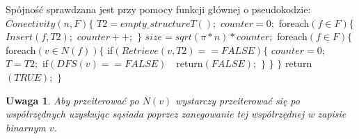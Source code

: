 \documentclass{pracamgr}
\newtheorem{remark}[theorem]{Uwaga}
\begin{document}
     Spójność sprawdzana jest przy pomocy funkcji głównej o pseudokodzie:\newline\newline
     \hspace*{0pt}$Conectivity(n,F)\{$\newline
     \hspace*{16pt}	$T2=empty\_structureT();$\newline
     \hspace*{16pt}	$counter=0;$\newline
     \hspace*{16pt}	foreach$(f\in F)\{$\newline
     \hspace*{32pt}		$Insert(f,T2);$\newline
     \hspace*{32pt}		$counter++;$\newline
     \hspace*{16pt}	$\}$\newline
     \hspace*{16pt}	$size=sqrt(\pi*n)*counter;$\newline
     \hspace*{16pt}	foreach$(f\in F)\{$\newline
     \hspace*{32pt}		foreach$(v\in N(f))\{$\newline
     \hspace*{48pt}			if$(Retrieve(v,T2)==FALSE)\{$\newline
     \hspace*{64pt}				$counter=0;$\newline
     \hspace*{64pt}				$T=T2;$\newline
     \hspace*{64pt}				if$(DFS(v)==FALSE)\quad $return$(FALSE);$\newline
     \hspace*{48pt}			$\}$\newline
     \hspace*{32pt}		$\}$\newline
     \hspace*{16pt}	$\}$\newline
     \hspace*{16pt}	return$(TRUE);$\newline
     \hspace*{0pt}$\}$\newline
     \begin{remark}\label{przeszukiwanie N(v)}
      Aby przeiterować po $N(v)$ wystarczy przeiterować się po współrzędnych uzyskując sąsiada poprzez zanegowanie tej współrzędnej w zapisie binarnym $v$.
     \end{remark}
\end{document}
